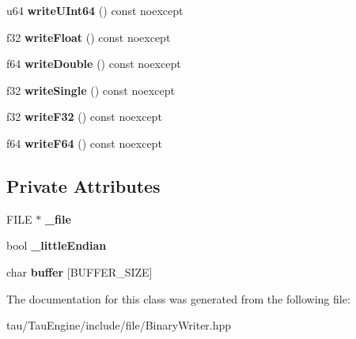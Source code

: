 \begin{DoxyCompactItemize}
u64 {\bfseries write\+U\+Int64} () const noexcept
\item 
\mbox{\label{class_binary_writer_a88acb3536650946fe03ca5f599fc5e6b}} 
f32 {\bfseries write\+Float} () const noexcept
\item 
\mbox{\label{class_binary_writer_a07b0e8c8ece5e53b8c99c974983596b8}} 
f64 {\bfseries write\+Double} () const noexcept
\item 
\mbox{\label{class_binary_writer_ac54bca9d85496b173d84b9737a74b96c}} 
f32 {\bfseries write\+Single} () const noexcept
\item 
\mbox{\label{class_binary_writer_aa563599101f0e00241febf73281b826c}} 
f32 {\bfseries write\+F32} () const noexcept
\item 
\mbox{\label{class_binary_writer_aa9a2152d7c8cf6d82108591d7be4f59c}} 
f64 {\bfseries write\+F64} () const noexcept
\end{DoxyCompactItemize}
\subsection*{Private Attributes}
\begin{DoxyCompactItemize}
\item 
\mbox{\label{class_binary_writer_a1a85d0e2e7c36739facd127716b30cfb}} 
F\+I\+LE $\ast$ {\bfseries \+\_\+file}
\item 
\mbox{\label{class_binary_writer_a888eda40ea00d6b6bdaa25dc005af278}} 
bool {\bfseries \+\_\+little\+Endian}
\item 
\mbox{\label{class_binary_writer_aba2f44f27c82f24c49429e40511fe6b0}} 
char {\bfseries buffer} \mbox{[}B\+U\+F\+F\+E\+R\+\_\+\+S\+I\+ZE\mbox{]}
\end{DoxyCompactItemize}


The documentation for this class was generated from the following file\+:\begin{DoxyCompactItemize}
\item 
tau/\+Tau\+Engine/include/file/Binary\+Writer.\+hpp\end{DoxyCompactItemize}
